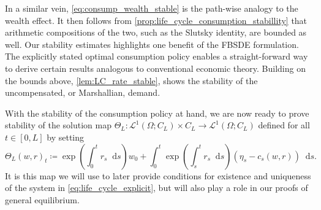 \documentclass[11pt,oneside,english,reqno,dvipsnames,table]{amsart}
\numberwithin{equation}{section}
\theoremstyle{plain}
\theoremstyle{definition}
\theoremstyle{remark}
\theoremstyle{plain}
\theoremstyle{plain}
\theoremstyle{plain}
\theoremstyle{plain}
\theoremstyle{plain}
\theoremstyle{plain}
\theoremstyle{plain}
\newcommand{\scL}{\mathscr{L}}
\newcommand{\dd}{\mathop{}\!\mathrm{d}}
\numberwithin{thm}{section}
\begin{document}
In a similar vein, \eqref{eq:consump_wealth_stable} is the path-wise analogy to the wealth effect.
It then follows from \ref{prop:life_cycle_consumption_stabillity} that arithmetic compositions of the two, such as the Slutsky identity, are bounded as well.
Our stability estimates highlights one benefit of the FBSDE formulation.
The explicitly stated optimal consumption policy enables a straight-forward way to derive certain results analogous to conventional economic theory.
Building on the bounds above, \eqref{lem:LC_rate_stable},  shows the stability of the uncompensated, or Marshallian, demand.


With the stability of the consumption policy at hand, we are now ready to prove stability of the solution  map $\Theta_L:\scL^1(\Omega;C_L)\times C_L \rightarrow \scL^1(\Omega;C_L) $ defined 
 for all $t\in [0,L]$ by setting
%
\begin{equation}\label{eq:Theta map}
\Theta_L(w,r)_t \coloneqq \exp\left(\int_{0}^t r_s \dd s\right)w_0 + \int_0^t \exp\left(\int_{s}^t r_s \dd s\right)\left(\eta_s-c_s(w,r) \right) \dd s.
\end{equation}
%
It is this map we will use to later provide conditions for existence and uniqueness of the system in \eqref{eq:life_cycle_explicit}, but will also play a role in our proofs of general equilibrium. 
\end{document}
